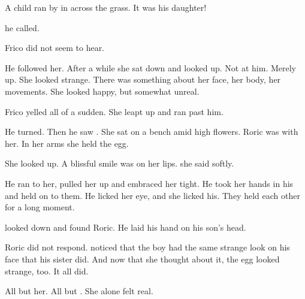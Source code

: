 

A child ran by in across the grass. 
It was his daughter! 

 he called. 

Frico did not seem to hear. 


He followed her. 
After a while she sat down and looked up. 
Not at him. 
Merely up. 
She looked strange. 
There was something about her face, her body, her movements. 
She looked happy, but somewhat unreal. 


 Frico yelled all of a sudden. 
She leapt up and ran past him. 

He turned. 
Then he saw \Tiroco. 
She sat on a bench amid high flowers. 
Roric was with her. 
In her arms she held the egg. 

\ta{\Tiroco!} 

She looked up. 
A blissful smile was on her lips. 
\ta{\Icor,} she said softly. 

He ran to her, pulled her up and embraced her tight. 
He took her hands in his and held on to them. 
He licked her eye, and she licked his. 
They held each other for a long moment. 

\Icor{} looked down and found Roric. 
He laid his hand on his son's head. 

Roric did not respond. 
\Icor{} noticed that the boy had the same strange look on his face that his sister did. 
And now that she thought about it, the egg looked strange, too. 
It all did. 

All but her. 
All but \Tiroco. 
She alone felt real. 



